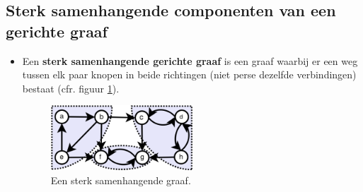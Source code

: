 \documentclass{report}
\begin{document}
\subsection{Sterk samenhangende componenten van een gerichte graaf}
\begin{itemize}
	\item[\info] Een \textbf{sterk samenhangende gerichte graaf} is een graaf waarbij er een weg tussen elk paar knopen in beide richtingen (niet perse dezelfde verbindingen) bestaat (cfr. figuur \ref{fig:sterk_samenhangende_graaf}).
	\begin{figure}[ht]
		\centering
		\includegraphics[width=0.5\textwidth]{img/sterk_samenhangende_graaf}
		\caption{Een sterk samenhangende graaf.}
		\label{fig:sterk_samenhangende_graaf}
	\end{figure}
				

\end{itemize}
\end{document}
